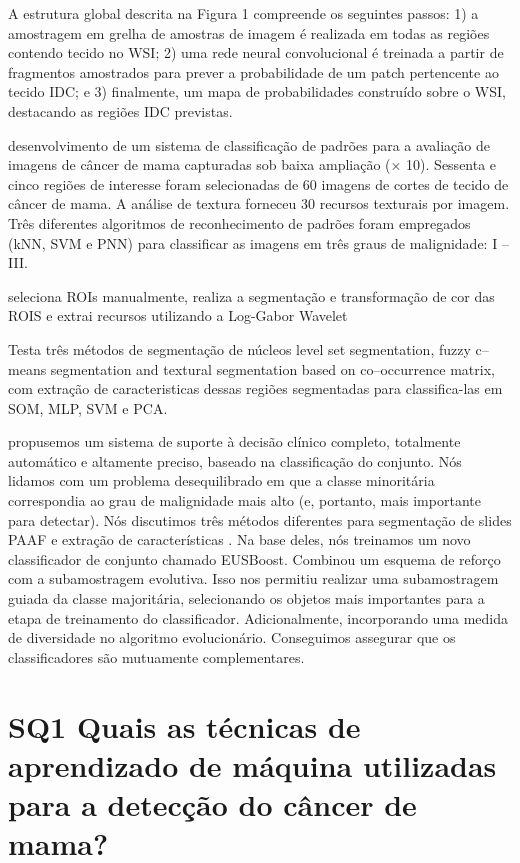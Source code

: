 \documentclass[preprint,12pt,authoryear]{elsarticle}
\begin{document}
\cite{CRUZROA2014} A estrutura global descrita na Figura 1 compreende os seguintes passos: 1) a amostragem em grelha de amostras de imagem é realizada em todas as regiões contendo tecido no WSI; 2) uma rede neural convolucional é treinada a partir de fragmentos amostrados para prever a probabilidade de um patch pertencente ao tecido IDC; e 3) finalmente, um mapa de probabilidades construído sobre o WSI, destacando as regiões IDC previstas.

\cite{LOUKAS2013} desenvolvimento de um sistema de classificação de padrões para a avaliação de imagens de câncer de mama capturadas sob baixa ampliação (× 10). Sessenta e cinco regiões de interesse foram selecionadas de 60 imagens de cortes de tecido de câncer de mama. A análise de textura forneceu 30 recursos texturais por imagem. Três diferentes algoritmos de reconhecimento de padrões foram empregados (kNN, SVM e PNN) para classificar as imagens em três graus de malignidade: I – III.

\cite{ISSACNIWAS2012} seleciona ROIs manualmente, realiza a segmentação e transformação de cor das ROIS e extrai recursos utilizando a Log-Gabor Wavelet

\cite{JELEN2009} Testa três métodos de segmentação de núcleos level set segmentation, fuzzy c–means segmentation and textural segmentation based on co–occurrence matrix, com extração de caracteristicas dessas regiões segmentadas para classifica-las em SOM, MLP, SVM e PCA.

\cite{KRAWCZYK2016} propusemos um sistema de suporte à decisão clínico completo, totalmente automático e altamente preciso, baseado na classificação do conjunto. Nós lidamos com um problema desequilibrado em que a classe minoritária correspondia ao grau de malignidade mais alto (e, portanto, mais importante para detectar). Nós discutimos três métodos diferentes para segmentação de slides PAAF e extração de características . Na base deles, nós treinamos um novo classificador de conjunto chamado EUSBoost. Combinou um esquema de reforço com a subamostragem evolutiva. Isso nos permitiu realizar uma subamostragem guiada da classe majoritária, selecionando os objetos mais importantes para a etapa de treinamento do classificador. Adicionalmente, incorporando uma medida de diversidade no algoritmo evolucionário. Conseguimos assegurar que os classificadores são mutuamente complementares.

\section{SQ1 Quais as técnicas de aprendizado de máquina utilizadas para a detecção do câncer de mama?}
\end{document}

